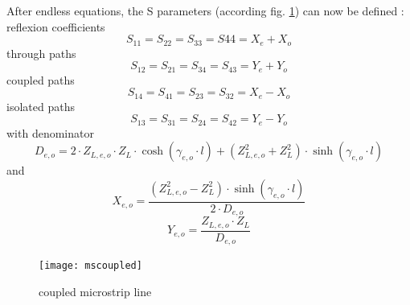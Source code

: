 \documentclass[10pt]{report}
\begin{document}
\addvspace{12pt}

After endless equations, the S parameters (according fig. \ref{fig:mscoupled})
can now be defined \cite{Edwards}:\\
reflexion coefficients
\begin{equation}
S_{11} = S_{22} = S_{33} = S{44} = X_e + X_o
\end{equation}
through paths
\begin{equation}
S_{12} = S_{21} = S_{34} = S_{43} = Y_e + Y_o
\end{equation}
coupled paths
\begin{equation}
S_{14} = S_{41} = S_{23} = S_{32} = X_e - X_o
\end{equation}
isolated paths
\begin{equation}
S_{13} = S_{31} = S_{24} = S_{42} = Y_e - Y_o
\end{equation}
with denominator
\begin{equation}
D_{e,o} = 2\cdot Z_{L,e,o}\cdot Z_L\cdot \cosh(\gamma_{e,o}\cdot l)
         + (Z_{L,e,o}^2 + Z_L^2)\cdot \sinh(\gamma_{e,o}\cdot l)
\end{equation}
and
\begin{equation}
X_{e,o} = \frac{(Z_{L,e,o}^2 - Z_L^2)\cdot \sinh(\gamma_{e,o}\cdot l)}{2\cdot D_{e,o}}
\end{equation}
\begin{equation}
Y_{e,o} = \frac{Z_{L,e,o}\cdot Z_L}{D_{e,o}}
\end{equation}

\begin{figure}[ht]
\begin{center}
\texttt{[image: mscoupled]}
\end{center}
\caption{coupled microstrip line}
\label{fig:mscoupled}
\end{figure}
\FloatBarrier
\end{document}
